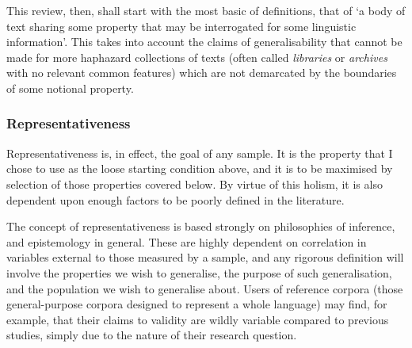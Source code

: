 
This review, then, shall start with the most basic of definitions, that of `a body of text sharing some property that may be interrogated for some linguistic information'.  This takes into account the claims of generalisability that cannot be made for more haphazard collections of texts (often called \textsl{libraries} or \textsl{archives} with no relevant common features) which are not demarcated by the boundaries of some notional property.










\subsubsection{Representativeness} %
Representativeness is, in effect, the goal of any sample.  It is the property that I chose to use as the loose starting condition above, and it is to be maximised by selection of those properties covered below.  By virtue of this holism, it is also dependent upon enough factors to be poorly defined in the literature.

The concept of representativeness is based strongly on philosophies of inference, and epistemology in general.  These are highly dependent on correlation in variables external to those measured by a sample, and any rigorous definition will involve the properties we wish to generalise, the purpose of such generalisation, and the population we wish to generalise about.  Users of reference corpora (those general-purpose corpora designed to represent a whole language) may find, for example, that their claims to validity are wildly variable compared to previous studies, simply due to the nature of their research question.


